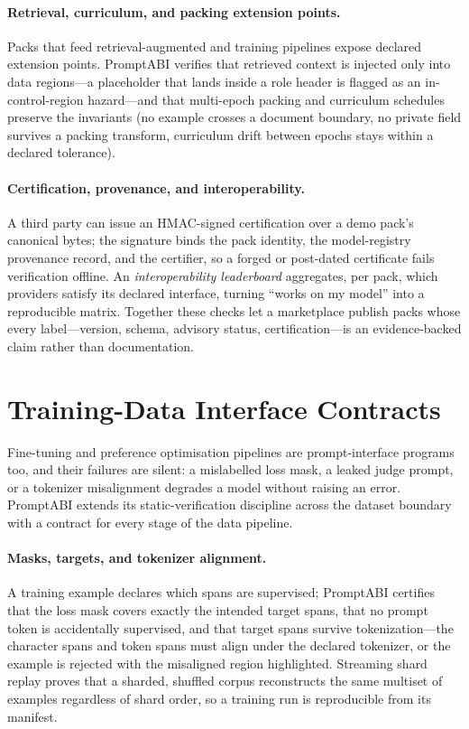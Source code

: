 \documentclass[10pt]{article}
\begin{document}
\paragraph{Retrieval, curriculum, and packing extension points.} Packs that feed
retrieval-augmented and training pipelines expose declared extension points.
PromptABI verifies that retrieved context is injected only into data regions---a
placeholder that lands inside a role header is flagged as an in-control-region
hazard---and that multi-epoch packing and curriculum schedules preserve the
invariants (no example crosses a document boundary, no private field survives a
packing transform, curriculum drift between epochs stays within a declared
tolerance).

\paragraph{Certification, provenance, and interoperability.} A third party can
issue an HMAC-signed certification over a demo pack's canonical bytes; the
signature binds the pack identity, the model-registry provenance record, and the
certifier, so a forged or post-dated certificate fails verification offline. An
\emph{interoperability leaderboard} aggregates, per pack, which providers satisfy
its declared interface, turning ``works on my model'' into a reproducible matrix.
Together these checks let a marketplace publish packs whose every label---version,
schema, advisory status, certification---is an evidence-backed claim rather than
documentation.

\newpage
\section{Training-Data Interface Contracts}

Fine-tuning and preference optimisation pipelines are prompt-interface programs
too, and their failures are silent: a mislabelled loss mask, a leaked judge
prompt, or a tokenizer misalignment degrades a model without raising an error.
PromptABI extends its static-verification discipline across the dataset boundary
with a contract for every stage of the data pipeline.

\paragraph{Masks, targets, and tokenizer alignment.} A training example declares
which spans are supervised; PromptABI certifies that the loss mask covers exactly
the intended target spans, that no prompt token is accidentally supervised, and
that target spans survive tokenization---the character spans and token spans must
align under the declared tokenizer, or the example is rejected with the
misaligned region highlighted. Streaming shard replay proves that a sharded,
shuffled corpus reconstructs the same multiset of examples regardless of shard
order, so a training run is reproducible from its manifest.
\end{document}
